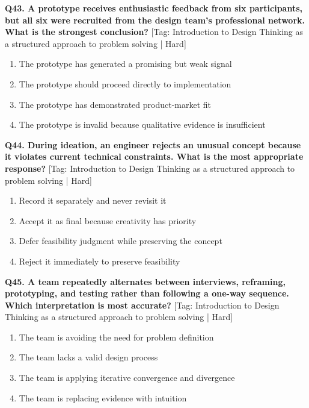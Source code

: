 \noindent\textbf{Q43. A prototype receives enthusiastic feedback from six participants, but all six were recruited from the design team's professional network. What is the strongest conclusion?} \hfill [Tag: Introduction to Design Thinking as a structured approach to problem solving | Hard]
\begin{enumerate}[label=(\alph*),topsep=2pt,itemsep=1pt,partopsep=0pt,parsep=0pt]
    \item {The prototype has generated a promising but weak signal}
    \item {The prototype should proceed directly to implementation}
    \item {The prototype has demonstrated product-market fit}
    \item {The prototype is invalid because qualitative evidence is insufficient}
\end{enumerate}
\vspace{2mm}

\noindent\textbf{Q44. During ideation, an engineer rejects an unusual concept because it violates current technical constraints. What is the most appropriate response?} \hfill [Tag: Introduction to Design Thinking as a structured approach to problem solving | Hard]
\begin{enumerate}[label=(\alph*),topsep=2pt,itemsep=1pt,partopsep=0pt,parsep=0pt]
    \item {Record it separately and never revisit it}
    \item {Accept it as final because creativity has priority}
    \item {Defer feasibility judgment while preserving the concept}
    \item {Reject it immediately to preserve feasibility}
\end{enumerate}
\vspace{2mm}

\noindent\textbf{Q45. A team repeatedly alternates between interviews, reframing, prototyping, and testing rather than following a one-way sequence. Which interpretation is most accurate?} \hfill [Tag: Introduction to Design Thinking as a structured approach to problem solving | Hard]
\begin{enumerate}[label=(\alph*),topsep=2pt,itemsep=1pt,partopsep=0pt,parsep=0pt]
    \item {The team is avoiding the need for problem definition}
    \item {The team lacks a valid design process}
    \item {The team is applying iterative convergence and divergence}
    \item {The team is replacing evidence with intuition}
\end{enumerate}
\vspace{2mm}

